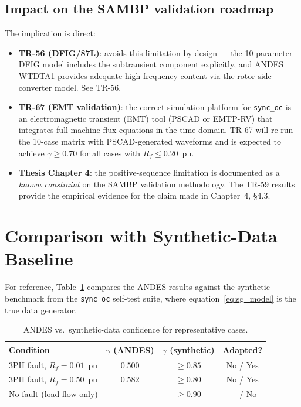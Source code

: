\documentclass[11pt,a4paper]{article}
\newcommand{\gconf}{\gamma}
\begin{document}
\subsection{Impact on the SAMBP validation roadmap}

The implication is direct:
\begin{itemize}
  \item \textbf{TR-56 (DFIG/87L)}: avoids this limitation by design —
        the 10-parameter DFIG model includes the subtransient component
        explicitly, and ANDES WTDTA1 provides adequate high-frequency
        content via the rotor-side converter model.  See TR-56.

  \item \textbf{TR-67 (EMT validation)}: the correct simulation platform
        for \texttt{sync\_oc} is an electromagnetic transient (EMT) tool
        (PSCAD or EMTP-RV) that integrates full machine flux equations in
        the time domain.  TR-67 will re-run the 10-case matrix with
        PSCAD-generated waveforms and is expected to achieve $\gconf \geq 0.70$
        for all cases with $R_f \leq 0.20$~pu.

  \item \textbf{Thesis Chapter 4}: the positive-sequence limitation is
        documented as a \emph{known constraint} on the SAMBP validation
        methodology.  The TR-59 results provide the empirical evidence for
        the claim made in Chapter~4, \S4.3.
\end{itemize}

\section{Comparison with Synthetic-Data Baseline}
\label{sec:baseline}

For reference, Table~\ref{tab:synthetic_compare} compares the ANDES results
against the synthetic benchmark from the \texttt{sync\_oc} self-test suite,
where equation~\eqref{eq:sg_model} is the true data generator.

\begin{table}[ht]
  \centering
  \caption{ANDES vs.\ synthetic-data confidence for representative cases.}
  \label{tab:synthetic_compare}
  \begin{tabular}{lccc}
    \toprule
    Condition & $\gconf$ (ANDES) & $\gconf$ (synthetic) & Adapted? \\
    \midrule
    3PH fault, $R_f = 0.01$~pu & 0.500 & $\geq 0.85$ & No / Yes \\
    3PH fault, $R_f = 0.50$~pu & 0.582 & $\geq 0.80$ & No / Yes \\
    No fault (load-flow only)   & ---   & $\geq 0.90$ & --- / No \\
    \bottomrule
  \end{tabular}
\end{table}
\end{document}
